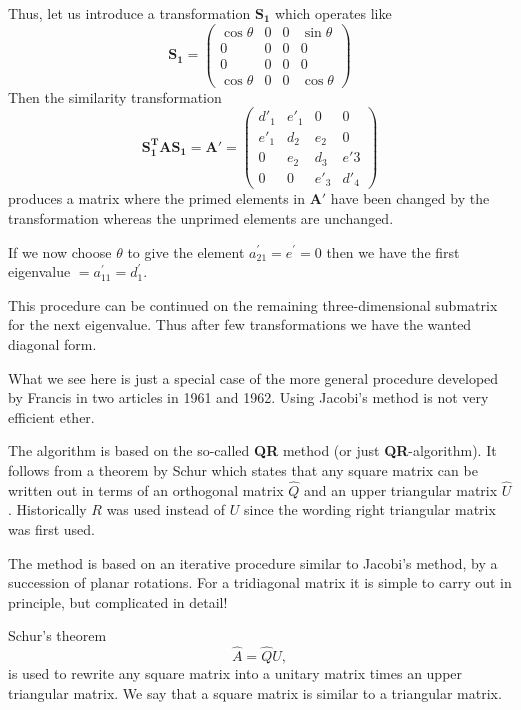 \documentclass[%
oneside,                 %
final,                   %
10pt]{article}
\begin{document}
Thus, let us introduce  a transformation $\mathbf{S_{1}}$ which operates like
\[
 \mathbf{S_{1}} =
      \left( \begin{array}{cccc} 
                \cos \theta & 0 & 0 & \sin \theta\\
                 0       & 0 & 0 &      0      \\
                   0        & 0 & 0 &      0      \\
               \cos \theta & 0 & 0 & \cos \theta 
             \end{array} \right)
\]
Then the similarity transformation 
\[
\mathbf{S_{1}^{T} A  S_{1}} = \mathbf{A'} = 
      \left( \begin{array}{cccc}
              d'_{1} & e'_{1} &   0    &   0   \\
              e'_{1}  & d_{2}  & e_{2}  &   0   \\
                0    & e_{2}  & d_{3}  & e'{3} \\
                0    &   0    & e'_{3} & d'_{4}
             \end{array} \right)
\]
produces a matrix where the primed elements in $\mathbf{A'}$ have been
changed by the transformation whereas the unprimed elements are unchanged.

If we now choose $\theta$ to
give the element $a_{21}^{'} = e^{'}= 0$ then we have the first
eigenvalue  $= a_{11}^{'} = d_{1}^{'}$.

This procedure can be continued on the remaining three-dimensional
submatrix for the next eigenvalue. Thus after few transformations    
we have the wanted diagonal form.

What we see here is just a special case of the more general procedure 
developed by Francis in two articles in 1961 and 1962. Using Jacobi's method is not very efficient ether. 

The algorithm is based on the so-called \textbf{QR} method (or just \textbf{QR}-algorithm). It follows from a theorem by Schur which states that any square matrix can be written out in terms of an orthogonal matrix $\hat{Q}$ and an upper triangular matrix $\hat{U}$. Historically $R$ was used instead of 
$U$ since the wording right triangular matrix was first used.

The method is based on an iterative procedure similar to Jacobi's method, by a succession of
planar rotations. For a tridiagonal matrix it is simple to carry out in principle, but complicated in detail!

Schur's theorem
\[
\hat{A} = \hat{Q}\hat{U},
\]
is used to rewrite any square matrix into a unitary matrix times an upper triangular matrix.
We say that a square matrix is similar to a triangular matrix. 
\end{document}
